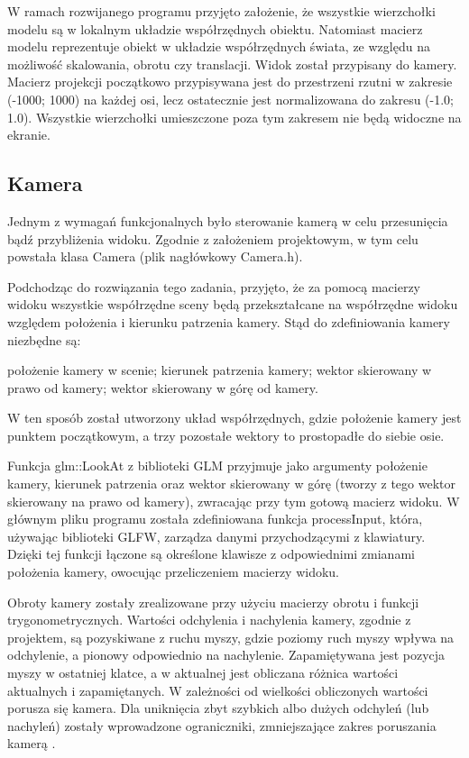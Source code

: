W ramach rozwijanego programu przyjęto założenie, że wszystkie wierzchołki modelu są w lokalnym układzie współrzędnych obiektu. Natomiast macierz modelu reprezentuje  obiekt w układzie współrzędnych świata, ze względu na możliwość skalowania, obrotu czy translacji. Widok został przypisany do kamery. Macierz projekcji początkowo przypisywana jest do przestrzeni rzutni w zakresie (-1000; 1000) na każdej osi, lecz ostatecznie jest normalizowana do zakresu (-1.0; 1.0). Wszystkie wierzchołki umieszczone poza tym zakresem nie będą widoczne na ekranie.

\subsection{Kamera}
Jednym z wymagań funkcjonalnych było sterowanie kamerą w celu przesunięcia bądź przybliżenia widoku. Zgodnie z założeniem projektowym, w tym celu powstała klasa Camera (plik nagłówkowy Camera.h).

Podchodząc do rozwiązania tego zadania, przyjęto, że za pomocą macierzy widoku wszystkie współrzędne sceny będą przekształcane na współrzędne widoku względem położenia i kierunku patrzenia kamery. Stąd do zdefiniowania kamery niezbędne są:
\begin{itemize}
\itemi położenie kamery w scenie;
\itemi kierunek patrzenia kamery;
\itemi wektor skierowany w prawo od kamery;
\itemi wektor skierowany w górę od kamery.
\end{itemize}
W ten sposób został utworzony układ współrzędnych, gdzie położenie kamery jest punktem początkowym, a trzy pozostałe wektory to prostopadłe do siebie osie.

Funkcja glm::LookAt z biblioteki GLM przyjmuje jako argumenty położenie kamery, kierunek patrzenia oraz wektor skierowany w górę (tworzy z tego wektor skierowany na prawo od kamery), zwracając przy tym gotową macierz widoku. W głównym pliku programu została zdefiniowana funkcja processInput, która, używając biblioteki GLFW, zarządza danymi przychodzącymi z klawiatury. Dzięki tej funkcji łączone są określone klawisze z odpowiednimi zmianami położenia kamery, owocując przeliczeniem macierzy widoku.

Obroty kamery zostały zrealizowane przy użyciu macierzy obrotu i funkcji trygonometrycznych. Wartości odchylenia i nachylenia kamery, zgodnie z projektem, są pozyskiwane z ruchu myszy, gdzie poziomy ruch myszy wpływa na odchylenie, a pionowy odpowiednio na nachylenie. Zapamiętywana jest pozycja myszy w ostatniej klatce, a w aktualnej jest obliczana różnica wartości aktualnych i zapamiętanych. W zależności od wielkości obliczonych wartości porusza się kamera. Dla uniknięcia zbyt szybkich albo dużych odchyleń (lub nachyleń) zostały wprowadzone ograniczniki, zmniejszające zakres poruszania kamerą \cite{learnopengl}.

